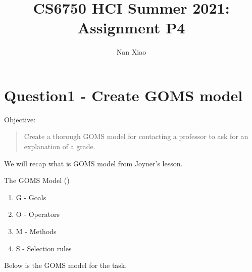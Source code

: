 \documentclass[
	letterpaper, %
]{jdf}
\author{Nan Xiao}
\title{CS6750 HCI Summer 2021:\\Assignment P4}
\begin{document}

\maketitle

\section{Question1 - Create GOMS model}
Objective: 
\begin{quote}
    Create a thorough GOMS model for contacting a professor to ask for an explanation of a grade.
\end{quote}

We will recap what is GOMS model from Joyner's lesson.

The GOMS Model (\cite{joyner2016a})
\begin{enumerate}
    \item G - Goals
    \item O - Operators
    \item M - Methods
    \item S - Selection rules
\end{enumerate}

Below is the GOMS model for the task.
\end{document}
